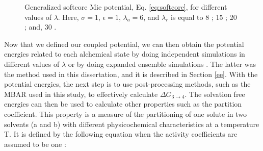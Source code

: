 \begin{figure}
	\hspace{0.05cm}%
	\caption[Generalized softcore Mie potential, Eq. \ref{eq:softcore}, for different values of $\lambda$.]{Generalized softcore Mie potential, Eq. \ref{eq:softcore}, for different values of $\lambda$. Here, $\sigma=1$, $\epsilon=1$, $\lambda _{a} = 6$, and $\lambda _{r}$ is equal to
		8 ;
		15 ;
		20 ; and,
		30 .}%
	\label{fig:scmie}
\end{figure}

Now that we defined our coupled potential, we can then obtain the potential energies related to each alchemical state by doing independent simulations in different values of $\lambda$ or by doing expanded ensemble simulations \cite{lyubartsev}. The latter was the method used in this dissertation, and it is described in Section \ref{ee}. With the potential energies, the next step is to use post-processing methods, such as the MBAR used in this study, to effectively calculate $\Delta G_{3 \rightarrow 4}$.  The solvation free energies can then be used to calculate other properties such as the partition coefficient. This property is a measure of the partitioning of one solute in two solvents (a and b) with different physicochemical characteristics  at a temperature T. It is defined by the following equation when the activity coefficients are assumed to be one \cite{doi:10.1021/ja00036a009}:

